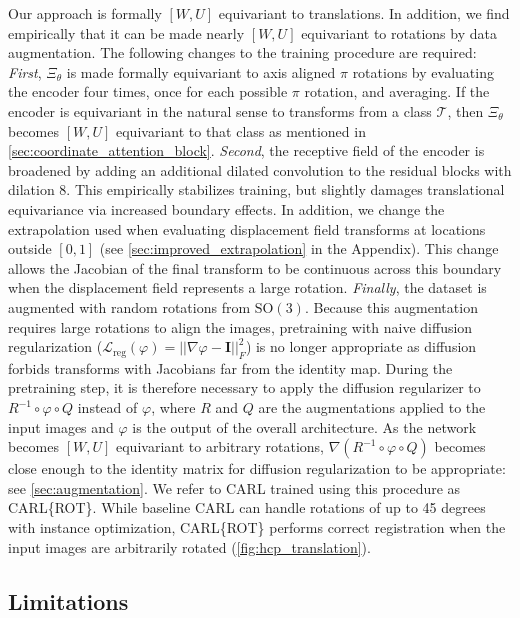 Our approach is formally $[W, U]$ equivariant to translations. In addition, we find empirically that it can be made nearly $[W, U]$ equivariant to rotations by data augmentation. The following changes to the training procedure are required: \emph{First}, $\Xi_\theta$ is made formally equivariant to axis aligned $\pi$ rotations by evaluating the encoder four times, once for each possible $\pi$ rotation, and averaging. If the encoder is equivariant in the natural sense to transforms from a class $\mathcal{T}$, then $\Xi_\theta$ becomes $[W, U]$ equivariant to that class as mentioned in \ref{sec:coordinate_attention_block}. \emph{Second}, the receptive field of the encoder is broadened by adding an additional dilated convolution to the residual blocks with dilation 8. This empirically stabilizes training, but slightly damages translational equivariance via increased boundary effects. In addition, we change the extrapolation used when evaluating displacement field transforms at locations outside $[0, 1]$ (see \ref{sec:improved_extrapolation} in the Appendix). This change allows the Jacobian of the final transform to be continuous across this boundary when the displacement field represents a large rotation. \emph{Finally}, the dataset is augmented with random rotations from $\text{SO}(3)$. Because this augmentation requires large rotations to align the images, pretraining with naive diffusion regularization (\ie $\mathcal{L}_\text{reg}(\varphi) = ||\nabla \varphi - \boldsymbol{I}||^2_F$) is no longer appropriate as diffusion forbids transforms with Jacobians far from the identity map. During the pretraining step, it is therefore necessary to apply the diffusion regularizer to $R^{-1} \circ \varphi \circ Q$ instead of $\varphi$, where $R$ and $Q$ are the augmentations applied to the input images and $\varphi$ is the output of the overall architecture. As the network becomes $[W, U]$ equivariant to arbitrary rotations, $\nabla (R^{-1} \circ \varphi \circ Q)$ becomes close enough to the identity matrix for diffusion regularization to be appropriate: see \ref{sec:augmentation}. We refer to CARL trained using this procedure as CARL\{ROT\}. While baseline CARL can handle rotations of up to 45 degrees with instance optimization, CARL\{ROT\} performs correct registration when the input images are arbitrarily rotated (\ref{fig:hcp_translation}).

\subsection{Limitations}
\label{subsection:limitations}

